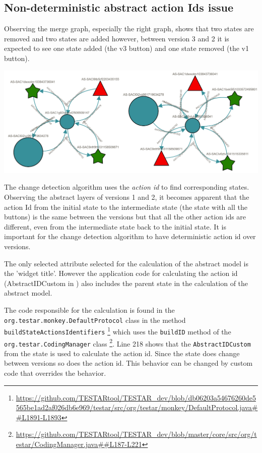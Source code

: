 \subsection{Non-deterministic abstract action Ids issue}

Observing the merge graph, especially the right graph, shows that two states are removed and two states are added however, between version 3 and 2 it is expected to see one state added (the v3 button) and one state removed (the v1 button).

\begingroup
\captionsetup{type=figure}
\includegraphics[scale=0.5]{images/6-Wrong-merge.png}
\label{fig:wrong-merge-outcome}
\endgroup

The change detection algorithm uses the \textit{action id} to find corresponding states. Observing the abstract layers of versions 1 and 2, it becomes apparent that the action Id from the initial state to the intermediate state (the state with all the buttons) is the same between the versions but that all the other action ids are different, even from the intermediate state back to the initial state. It is important for the change detection algorithm to have deterministic action id over versions. 

The only selected attribute selected for the calculation of the abstract model is the 'widget title'. However the application code for calculating the action id (AbstractIDCustom in \testar) also includes the parent state in the calculation of the abstract model.

The code responsible for the calculation is found in the \verb|org.testar.monkey.DefaultProtocol| class in the method \verb|buildStateActionsIdentifiers| \footnote{\url{https://github.com/TESTARtool/TESTAR_dev/blob/db06203a54676260de5565be1ad2af026db6e969/testar/src/org/testar/monkey/DefaultProtocol.java##L1891-L1893}} which uses the \verb|buildID| method of the \\ \verb|org.testar.CodingManager| class \footnote{\url{https://github.com/TESTARtool/TESTAR_dev/blob/master/core/src/org/testar/CodingManager.java##L187-L221}}. Line 218 shows that the \verb|AbstractIDCustom| from the state is used to calculate the action id. Since the state does change between versions so does the action id. This behavior can be changed by custom code that overrides the behavior. 

